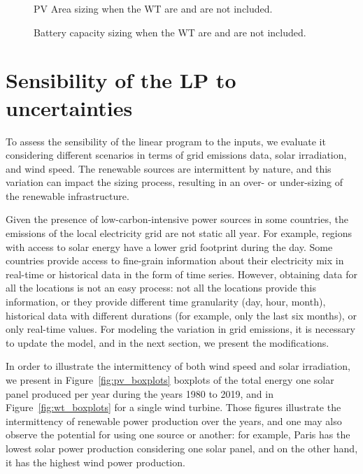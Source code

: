 \begin{figure}[H]
  \centering
  {}
  \caption{PV Area sizing when the WT are and are not included. }
  \label{fig:wind_pv}
\end{figure}


\begin{figure}[h]
  \centering
  {}
  \caption{Battery capacity sizing when the WT are and are not included. }
  \label{fig:wind_bat}

\end{figure}


\section{Sensibility of the LP to  uncertainties}
\label{sec:sensitivity}

To assess the sensibility of the linear program to the inputs, we evaluate it considering different scenarios in terms of grid emissions data, solar irradiation, and wind speed. The renewable sources are intermittent by nature, and this variation can impact the sizing process, resulting in an over- or under-sizing of the renewable infrastructure.

Given the presence of low-carbon-intensive power sources in some countries, the emissions of the local electricity grid are not static all year. For example, regions with access to solar energy have a lower grid footprint during the day. Some countries provide access to fine-grain information about their electricity mix in real-time or historical data in the form of time series. However, obtaining data for all the locations is not an easy process: not all the locations provide this information, or they provide different time granularity (day, hour, month), historical data with different durations (for example, only the last six months), or only real-time values. For modeling the variation in grid emissions, it is necessary to update the model, and in the next section, we present the modifications.


In order to illustrate the intermittency of both wind speed and solar irradiation, we present in Figure~\ref{fig:pv_boxplots} boxplots of the total energy one solar panel produced per year during the years 1980 to 2019, and in Figure~\ref{fig:wt_boxplots} for a single wind turbine. Those figures illustrate the intermittency of renewable power production over the years, and one may also observe the potential for using one source or another: for example, Paris has the lowest solar power production considering one solar panel, and on the other hand, it has the highest wind power production. 

